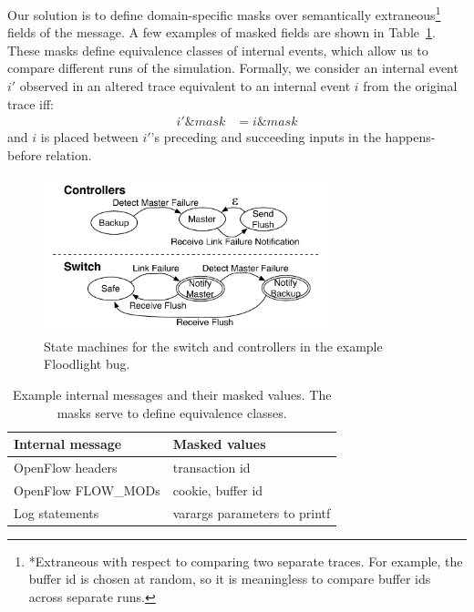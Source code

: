 Our solution is to define domain-specific masks over
semantically extraneous\footnote{*Extraneous with respect to comparing two
separate traces. For example, the buffer id is chosen at random, so
it is meaningless to compare buffer ids across separate runs.} fields of
the message. A few examples of masked fields are shown
in Table~\ref{tab:fingerprints}. These masks define equivalence classes
of internal events, which allow us to compare different runs of the simulation.
Formally, we consider an internal event $i'$ observed in an altered trace
equivalent to an internal event $i$ from the original trace iff:
\begin{align*}
i' \mathrel{\&} mask &= i \mathrel{\&} mask
\end{align*}
and $i$ is placed between $i'$'s preceding and succeeding inputs in the
happens-before relation. 

\begin{figure}[t]
    \includegraphics[width=3.25in]{../diagrams/state_machines/controller_switch.pdf}
    \caption[]{\label{fig:state_machines} State machines for the switch and
    controllers in the example Floodlight bug. }
\end{figure}

\begin{table}
\centering
\begin{tabular}{|l|l|}
\hline
Internal message & Masked values \\
\hline
OpenFlow headers & transaction id\\
OpenFlow FLOW\_MODs & cookie, buffer id \\
Log statements & varargs parameters to printf \\
\hline
\end{tabular}
\caption{Example internal messages and their masked values. The masks serve to
define equivalence classes.}
\label{tab:fingerprints}
\end{table}

